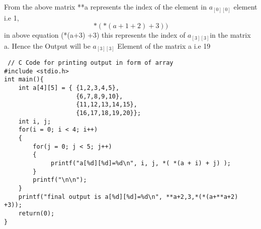 \documentclass[journal,12pt,twocolumn]{IEEEtran}
\begin{document}
From the above matrix **a represents the index of the element in $a_{[0][0]}$ element i.e 1, 
\begin{equation}
    *(*(a+1+2) +3)) 
\end{equation}
in above equation (*(a+3) +3) this represents the index of $a_{[3][3]}$in the matrix a. 
 Hence the Output will be $a_{[3][3]}$ Element of the matrix a i.e 19
 \begin{lstlisting}
 // C Code for printing output in form of array
#include <stdio.h>
int main(){
    int a[4][5] = { {1,2,3,4,5},
                    {6,7,8,9,10},
                    {11,12,13,14,15},
                    {16,17,18,19,20}};
    int i, j;
    for(i = 0; i < 4; i++)
    {
        for(j = 0; j < 5; j++)
        {
             printf("a[%d][%d]=%d\n", i, j, *( *(a + i) + j) );
        }
        printf("\n\n");
    }
    printf("final output is a[%d][%d]=%d\n", **a+2,3,*(*(a+**a+2) +3));
    return(0);
}
\end{lstlisting}
\end{document}
